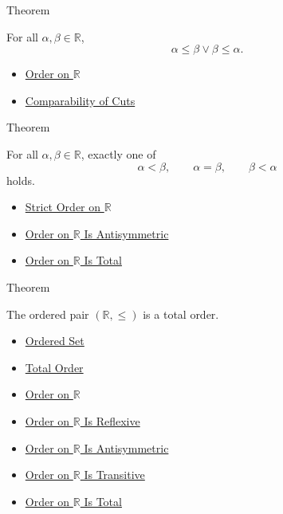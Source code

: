 \begin{theorembox}{Theorem}
\begin{theorem}
\label{thm:order-on-r-total}
For all $\alpha,\beta\in\mathbb{R}$,
\[
\alpha\le\beta\lor\beta\le\alpha.
\]
\end{theorem}
\end{theorembox}

\begin{dependencies}
\begin{itemize}
  \item \hyperref[def:order-on-r]{Order on $\mathbb{R}$}
  \item \hyperref[thm:comparability-of-cuts]{Comparability of Cuts}
\end{itemize}
\end{dependencies}

\begin{theorembox}{Theorem}
\begin{theorem}
\label{thm:trichotomy-on-r}
For all $\alpha,\beta\in\mathbb{R}$, exactly one of
\[
\alpha<\beta,\qquad \alpha=\beta,\qquad \beta<\alpha
\]
holds.
\end{theorem}
\end{theorembox}

\begin{dependencies}
\begin{itemize}
  \item \hyperref[def:strict-order-on-r]{Strict Order on $\mathbb{R}$}
  \item \hyperref[thm:order-on-r-antisymmetric]{Order on $\mathbb{R}$ Is Antisymmetric}
  \item \hyperref[thm:order-on-r-total]{Order on $\mathbb{R}$ Is Total}
\end{itemize}
\end{dependencies}

\begin{theorembox}{Theorem}
\begin{theorem}
\label{thm:r-totally-ordered-set}
The ordered pair $(\mathbb{R},\le)$ is a total order.
\end{theorem}
\end{theorembox}

\begin{dependencies}
\begin{itemize}
  \item \hyperref[def:ordered-set]{Ordered Set}
  \item \hyperref[def:total-order]{Total Order}
  \item \hyperref[def:order-on-r]{Order on $\mathbb{R}$}
  \item \hyperref[thm:order-on-r-reflexive]{Order on $\mathbb{R}$ Is Reflexive}
  \item \hyperref[thm:order-on-r-antisymmetric]{Order on $\mathbb{R}$ Is Antisymmetric}
  \item \hyperref[thm:order-on-r-transitive]{Order on $\mathbb{R}$ Is Transitive}
  \item \hyperref[thm:order-on-r-total]{Order on $\mathbb{R}$ Is Total}
\end{itemize}
\end{dependencies}
